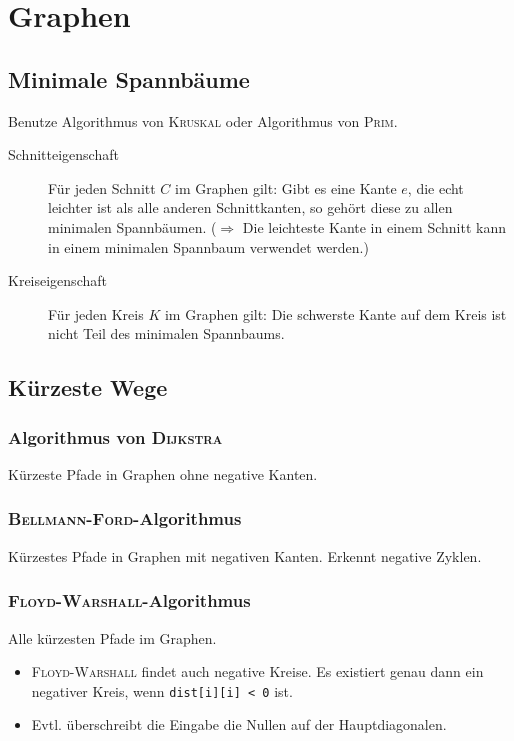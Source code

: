 \section{Graphen}

\subsection{Minimale Spannbäume}
Benutze Algorithmus von \textsc{Kruskal} oder Algorithmus von \textsc{Prim}.
\begin{description}
	\item[Schnitteigenschaft] Für jeden Schnitt $C$ im Graphen gilt: Gibt es eine Kante $e$, die echt leichter ist als alle anderen Schnittkanten, so gehört diese zu allen minimalen Spannbäumen. ($\Rightarrow$ Die leichteste Kante in einem Schnitt kann in einem minimalen Spannbaum verwendet werden.)
	\item[Kreiseigenschaft] Für jeden Kreis $K$ im Graphen gilt: Die schwerste Kante auf dem Kreis ist nicht Teil des minimalen Spannbaums.
\end{description}

\subsection{Kürzeste Wege}

\subsubsection{Algorithmus von \textsc{Dijkstra}}
Kürzeste Pfade in Graphen ohne negative Kanten.


\subsubsection{\textsc{Bellmann-Ford}-Algorithmus}
Kürzestes Pfade in Graphen mit negativen Kanten. Erkennt negative Zyklen.


\subsubsection{\textsc{Floyd-Warshall}-Algorithmus}
Alle kürzesten Pfade im Graphen.

\begin{itemize}
	\item \textsc{Floyd-Warshall} findet auch negative Kreise. Es existiert genau dann ein negativer Kreis, wenn \lstinline{dist[i][i] < 0} ist.
	\item Evtl. überschreibt die Eingabe die Nullen auf der Hauptdiagonalen.
\end{itemize}

